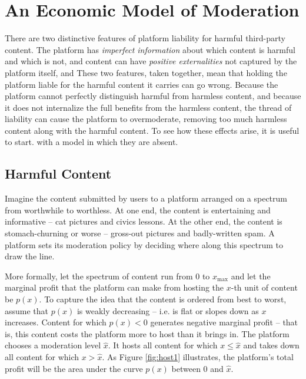\newcommand{\xmax}{x_{\text{max}}}
\newcommand{\xbi}{x_{\text{BI}}^p}
\newcommand{\xsl}{x_{\text{SL}}^p}
\newcommand{\xsubi}{x_{\text{I}}^p}

\section{An Economic Model of Moderation}
\label{sec:model}

There are two distinctive features of platform liability for harmful third-party content. The platform has \emph{imperfect information} about which content is harmful and which is not, and  content can have \emph{positive externalities} not captured by the platform itself, and  These two features, taken together, mean that holding the platform liable for the harmful content it carries can go wrong. Because the platform cannot perfectly distinguish harmful from harmless content, and because it does not internalize the full benefits from the harmless content, the thread of liability can cause the platform to overmoderate, removing too much harmless content along with the harmful content. To see how these effects arise, it is useful to start. with a model in which they are absent.


\subsection{Harmful Content}

Imagine the content submitted by users to a platform arranged on a spectrum from worthwhile to worthless. At one end, the content is entertaining and informative -- cat pictures and civics lessons. At the other end, the content is stomach-churning or worse -- gross-out pictures and badly-written spam. A platform sets its moderation policy by deciding where along this spectrum to draw the line.

More formally, let the spectrum of content run from $0$ to $\xmax$ and let the marginal profit that the platform can make from hosting the $x$-th unit of content be $p(x)$. To capture the idea that the content is ordered from best to worst, assume that $p(x)$ is weakly decreasing -- i.e. is flat or slopes down as $x$ increases. Content for which $p(x) <0$ generates negative marginal profit -- that is, this content costs the platform more to host than it brings in. The platform chooses a moderation level $\hat{x}$. It hosts all content for which $x \le \hat{x}$ and takes down all content for which $x > \hat{x}$. As Figure \ref{fig:host1} illustrates, the platform's total profit will be the area under the curve $p(x)$ between $0$ and $\hat{x}$. 



